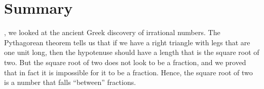 \documentclass[../../../main.tex]{subfiles}
\begin{document}
\section{Summary}

, we looked at the ancient Greek discovery of irrational numbers. The Pythagorean theorem tells us that if we have a right triangle with legs that are one unit long, then the hypotenuse should have a length that is the square root of two. But the square root of two does not look to be a fraction, and we proved that in fact it is impossible for it to be a fraction. Hence, the square root of two is a number that falls ``between'' fractions. 
\end{document}
